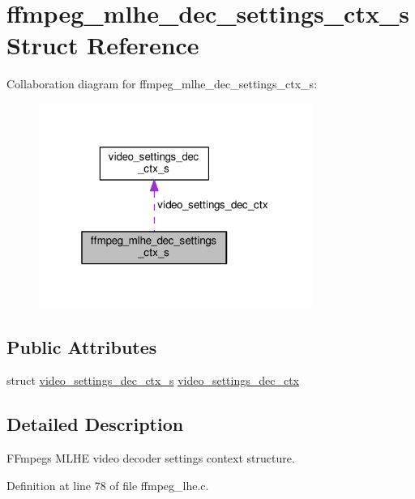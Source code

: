 \hypertarget{structffmpeg__mlhe__dec__settings__ctx__s}{}\section{ffmpeg\+\_\+mlhe\+\_\+dec\+\_\+settings\+\_\+ctx\+\_\+s Struct Reference}
\label{structffmpeg__mlhe__dec__settings__ctx__s}


Collaboration diagram for ffmpeg\+\_\+mlhe\+\_\+dec\+\_\+settings\+\_\+ctx\+\_\+s\+:\nopagebreak
\begin{figure}[H]
\begin{center}
\leavevmode
\includegraphics[width=253pt]{structffmpeg__mlhe__dec__settings__ctx__s__coll__graph}
\end{center}
\end{figure}
\subsection*{Public Attributes}
\begin{DoxyCompactItemize}
\item 
struct \hyperlink{structvideo__settings__dec__ctx__s}{video\+\_\+settings\+\_\+dec\+\_\+ctx\+\_\+s} \hyperlink{structffmpeg__mlhe__dec__settings__ctx__s_a82ab7d852e7f75a75a21127ede393026}{video\+\_\+settings\+\_\+dec\+\_\+ctx}
\end{DoxyCompactItemize}


\subsection{Detailed Description}
F\+Fmpeg\textquotesingle{}s M\+L\+HE video decoder settings context structure. 

Definition at line 78 of file ffmpeg\+\_\+lhe.\+c.



